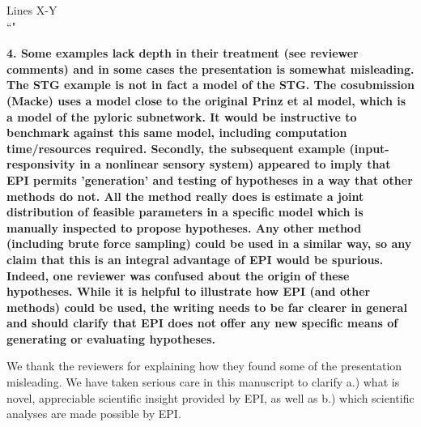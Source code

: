 \documentclass[11pt,a4paper]{article}
\begin{document}
\begin{displayquote}
Lines X-Y\\
``"
\end{displayquote}

\textbf{4. Some examples lack depth in their treatment (see reviewer comments) and in some cases the presentation is somewhat misleading. The STG example is not in fact a model of the STG. The cosubmission (Macke) uses a model close to the original Prinz et al model, which is a model of the pyloric subnetwork. It would be instructive to benchmark against this same model, including computation time/resources required. Secondly, the subsequent example (input-responsivity in a nonlinear sensory system) appeared to imply that EPI permits 'generation' and testing of hypotheses in a way that other methods do not. All the method really does is estimate a joint distribution of feasible parameters in a specific model which is manually inspected to propose hypotheses. Any other method (including brute force sampling) could be used in a similar way, so any claim that this is an integral advantage of EPI would be spurious. Indeed, one reviewer was confused about the origin of these hypotheses. While it is helpful to illustrate how EPI (and other methods) could be used, the writing needs to be far clearer in general and should clarify that EPI does not offer any new specific means of generating or evaluating hypotheses.}

We thank the reviewers for explaining how they found some of the
presentation misleading.  We have taken serious care in this manuscript to clarify a.)
what is novel, appreciable scientific insight provided by EPI, as well as b.) which scientific
analyses are made possible by EPI.
\end{document}
